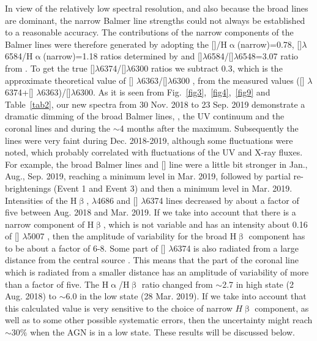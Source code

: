 \documentclass[fleqn,usenatbib]{mnras}
\begin{document}
In view of the relatively low spectral resolution, and also because the broad lines are dominant, the narrow Balmer line strengths could not always be established to a reasonable accuracy. The contributions of the narrow components of the  Balmer lines were therefore generated by adopting the []/H$\upalpha$(narrow)=0.78, []$\lambda$6584/H$\upalpha$(narrow)=1.18  ratios  determined by \cite{Silva2017} and []$\lambda$6584/[]$\lambda$6548=3.07 ratio from \cite{Storey2000}.  
To get the true []$\lambda$6374/[]$\lambda$6300 ratios we subtract 0.3, which is the approximate theoretical value of [] $\lambda$6363/[]$\lambda$6300 \citep[see e.g.,][]{Storey2000}, from the measured values ([] $\lambda$6374+[] $\lambda$6363)/[]$\lambda$6300.  As it is seen from Fig.~\ref{fig3},~\ref{fig4},~\ref{fig9} and Table~\ref{tab2}, our new spectra from 30 Nov. 2018 to 23 Sep. 2019 demonstrate a dramatic dimming of the broad Balmer lines, , the UV continuum and the coronal lines  and  during the $\sim$4 months after the maximum. Subsequently the lines were very faint during Dec. 2018-2019, although some fluctuations were noted, which probably correlated with fluctuations of the UV and X-ray fluxes. For example, the broad Balmer lines and [] line were a little bit stronger in Jan., Aug., Sep. 2019, reaching a minimum level in Mar. 2019, followed by partial re-brightenings (Event 1 and Event 3) and then a minimum level in Mar. 2019. Intensities of the H$\upbeta$,  $\lambda$4686 and [] $\lambda$6374 lines decreased by about a factor of five between Aug. 2018 and Mar. 2019. If we take into account that there is a narrow component of H$\upbeta$, which is not variable and has an intensity about 0.16 of [] $\lambda$5007 \citep{Silva2017}, then the amplitude of variability for the broad H$\upbeta$ component has to be about a  factor of 6-8. Some part of [] $\lambda$6374 is also radiated from a large distance from the central source \citep[see e.g.,][]{Oliver2005}.  This means that the part of the coronal line which is radiated from a smaller distance has  an amplitude of variability of more than a factor of five. The H$\upalpha$/H$\upbeta$ ratio changed from $\sim$2.7 in high state (2 Aug. 2018) to $\sim$6.0 in the low state (28 Mar. 2019). If we take into account that this calculated value is very sensitive to the choice of  narrow $H{\upbeta}$ component, as well as to some other possible systematic errors, then the uncertainty might reach $\sim30\%$ when the AGN is in a low state. These results will be discussed below.
\end{document}
